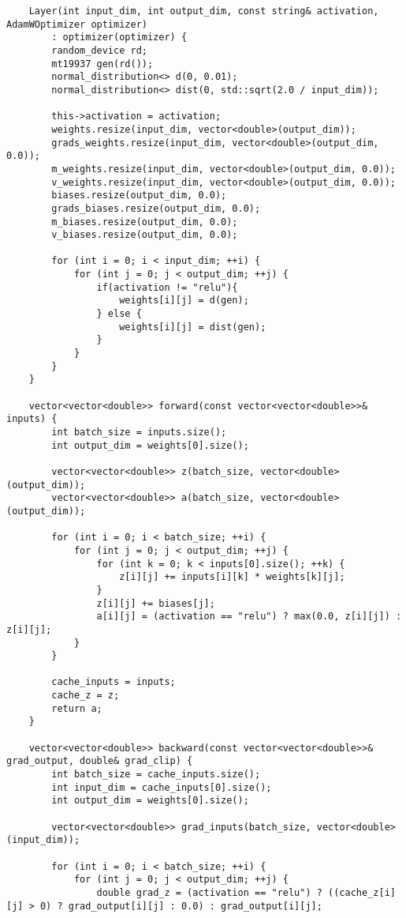 \begin{verbatim}
    Layer(int input_dim, int output_dim, const string& activation, AdamWOptimizer optimizer)
        : optimizer(optimizer) {
        random_device rd;
        mt19937 gen(rd());
        normal_distribution<> d(0, 0.01);
        normal_distribution<> dist(0, std::sqrt(2.0 / input_dim));
 
        this->activation = activation;
        weights.resize(input_dim, vector<double>(output_dim));
        grads_weights.resize(input_dim, vector<double>(output_dim, 0.0));
        m_weights.resize(input_dim, vector<double>(output_dim, 0.0));
        v_weights.resize(input_dim, vector<double>(output_dim, 0.0));
        biases.resize(output_dim, 0.0);
        grads_biases.resize(output_dim, 0.0);
        m_biases.resize(output_dim, 0.0);
        v_biases.resize(output_dim, 0.0);
 
        for (int i = 0; i < input_dim; ++i) {
            for (int j = 0; j < output_dim; ++j) {
                if(activation != "relu"){
                    weights[i][j] = d(gen);
                } else {
                    weights[i][j] = dist(gen);
                }
            }
        }
    }
 
    vector<vector<double>> forward(const vector<vector<double>>& inputs) {
        int batch_size = inputs.size();
        int output_dim = weights[0].size();
 
        vector<vector<double>> z(batch_size, vector<double>(output_dim));
        vector<vector<double>> a(batch_size, vector<double>(output_dim));
 
        for (int i = 0; i < batch_size; ++i) {
            for (int j = 0; j < output_dim; ++j) {
                for (int k = 0; k < inputs[0].size(); ++k) {
                    z[i][j] += inputs[i][k] * weights[k][j];
                }
                z[i][j] += biases[j];
                a[i][j] = (activation == "relu") ? max(0.0, z[i][j]) : z[i][j];
            }
        }
 
        cache_inputs = inputs;
        cache_z = z;
        return a;
    }
 
    vector<vector<double>> backward(const vector<vector<double>>& grad_output, double& grad_clip) {
        int batch_size = cache_inputs.size();
        int input_dim = cache_inputs[0].size();
        int output_dim = weights[0].size();
 
        vector<vector<double>> grad_inputs(batch_size, vector<double>(input_dim));
 
        for (int i = 0; i < batch_size; ++i) {
            for (int j = 0; j < output_dim; ++j) {
                double grad_z = (activation == "relu") ? ((cache_z[i][j] > 0) ? grad_output[i][j] : 0.0) : grad_output[i][j];
 

\end{verbatim}
